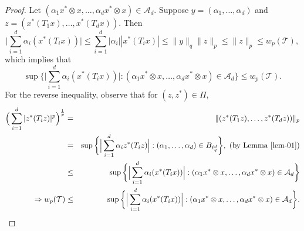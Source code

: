 \documentclass{amsart}
\theoremstyle{definition}
\theoremstyle{remark}
\numberwithin{equation}{section}
\begin{document}
\begin{proof}
Let 	$(\alpha_1x^*\otimes x,\ldots,\alpha_dx^*\otimes x)\in \mathcal{A}_d.$ Suppose $y=(\alpha_1,\ldots,\alpha_d)$ and $z=(x^*(T_1x),\ldots,x^*(T_dx)).$ Then 
 \[\Big|\sum_{i=1}^d\alpha_i(x^*(T_ix))\Big|\leq \sum_{i=1}^d|\alpha_i||x^*(T_ix)|\leq \|y\|_q\|z\|_p\leq \|z\|_p\leq w_p(\mathcal{T}),\]
 which implies that $$\sup\bigg\{\Big|\sum_{i=1}^d\alpha_i(x^*(T_ix))\Big|:(\alpha_1x^*\otimes x,\ldots,\alpha_dx^*\otimes x)\in \mathcal{A}_d\bigg\}\leq w_p(\mathcal{T}).$$
 For the reverse inequality, observe that for $(z,z^*)\in \Pi,$ 
 \begin{eqnarray*}
 	\Big(\sum_{i=1}^d|z^*(T_iz)|^p\Big)^{\frac{1}{p}}&=&\|(z^*(T_1z),\ldots,z^*(T_dz))\|_p\\
 	&=&\sup\bigg\{\Big|\sum_{i=1}^d\alpha_iz^*(T_iz)\Big|:(\alpha_1,\ldots,\alpha_d)\in B_{\ell_q^d}\bigg\}, ~(\text{by Lemma \ref{lem-01}})\\
 	&\leq&\sup\bigg\{\Big|\sum_{i=1}^d\alpha_i(x^*(T_ix))\Big|:(\alpha_1x^*\otimes x,\ldots,\alpha_dx^*\otimes x)\in \mathcal{A}_d\bigg\}\\
 	\Rightarrow w_p(\mathcal{T})&\leq& \sup\bigg\{\Big|\sum_{i=1}^d\alpha_i(x^*(T_ix))\Big|:(\alpha_1x^*\otimes x,\ldots,\alpha_dx^*\otimes x)\in \mathcal{A}_d\bigg\}.
 	\end{eqnarray*}
\end{proof}
 
\end{document}
